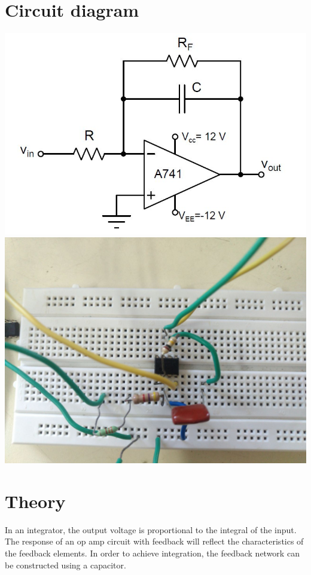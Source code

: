\documentclass[12pt, titlepage]{article}
\theoremstyle{definition}
\begin{document}
  \section*{Circuit diagram}
    \includegraphics[scale=0.5]{circuit}\\
    \includegraphics[scale=0.25]{practical_circuit}


  \newpage
  \section{Theory}
    In an integrator, the output voltage is proportional to the integral of the input.
    The response of an op amp circuit with feedback will reflect the characteristics of the feedback elements.
    In order to achieve integration, the feedback network can be constructed using a capacitor.
\end{document}
